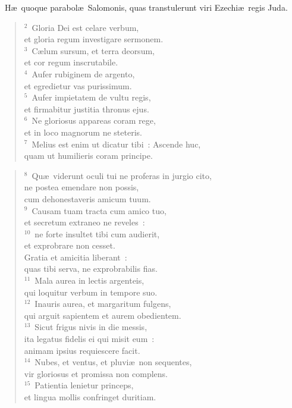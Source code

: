 ~\lettrine[lines=10,image=true,loversize=0.05,lraise=-0.03]{H}{}\ae\ quoque parabol\ae\ Salomonis, quas transtulerunt viri Ezechi\ae\ regis Juda.
\begin{flushleft}\begin{verse}\vspace{6pt}${}^{2}$~Gloria Dei est celare verbum,\\ et gloria regum investigare sermonem.\\
${}^{3}$~C\ae lum sursum, et terra deorsum,\\ et cor regum inscrutabile.\\
${}^{4}$~Aufer rubiginem de argento,\\ et egredietur vas purissimum.\\
${}^{5}$~Aufer impietatem de vultu regis,\\ et firmabitur justitia thronus ejus.\\
${}^{6}$~Ne gloriosus appareas coram rege,\\ et in loco magnorum ne steteris.\\
${}^{7}$~Melius est enim ut dicatur tibi~: Ascende huc,\\ quam ut humilieris coram principe.\end{verse}\end{flushleft}


\begin{flushleft}\begin{verse}${}^{8}$~Qu\ae\ viderunt oculi tui ne proferas in jurgio cito,\\ ne postea emendare non possis,\\ cum dehonestaveris amicum tuum.\\
${}^{9}$~Causam tuam tracta cum amico tuo,\\ et secretum extraneo ne reveles~:\\
${}^{10}$~ne forte insultet tibi cum audierit,\\ et exprobrare non cesset.\\ Gratia et amicitia liberant~:\\ quas tibi serva, ne exprobrabilis fias.\\
${}^{11}$~Mala aurea in lectis argenteis,\\ qui loquitur verbum in tempore suo.\\
${}^{12}$~Inauris aurea, et margaritum fulgens,\\ qui arguit sapientem et aurem obedientem.\\
${}^{13}$~Sicut frigus nivis in die messis,\\ ita legatus fidelis ei qui misit eum~:\\ animam ipsius requiescere facit.\\
${}^{14}$~Nubes, et ventus, et pluvi\ae\ non sequentes,\\ vir gloriosus et promissa non complens.\\
${}^{15}$~Patientia lenietur princeps,\\ et lingua mollis confringet duritiam.\end{verse}\end{flushleft}


